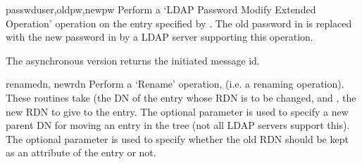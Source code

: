 \begin{methoddesc}[LDAPObject]{passwd}{user,oldpw,newpw
        }
Perform a `LDAP Password Modify Extended Operation' operation
on the entry specified by .
The old password in  is replaced with the new
password in  by a LDAP server supporting this operation.

The asynchronous version returns the initiated message id.

\begin{seealso}
\end{seealso}

\end{methoddesc}



\begin{methoddesc}[LDAPObject]{rename}{dn, newrdn  }
Perform a `Rename' operation, (i.e. a renaming operation).
These routines take  (the DN
of the entry whose RDN is to be changed, and , the new RDN to
give to the entry.
The optional parameter  is used to specify
a new parent DN for moving an entry in the tree
(not all LDAP servers support this).
The optional parameter  is used to specify
whether the old RDN should be kept as an attribute of the entry or not.
\end{methoddesc}


